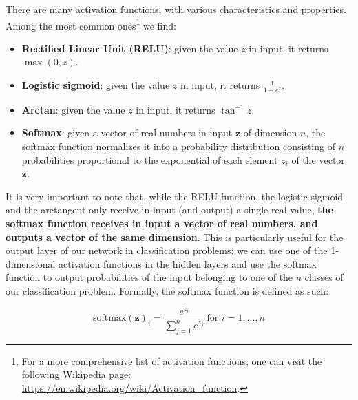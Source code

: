 There are many activation functions, with various characteristics and properties. Among the most common ones\footnote{For a more comprehensive list of activation functions, one can visit the following Wikipedia page: \url{https://en.wikipedia.org/wiki/Activation_function}.} we find:

\begin{itemize}
    \item \textbf{Rectified Linear Unit (RELU)}: given the value $z$ in input, it returns $\max(0,z)$.
    \item \textbf{Logistic sigmoid}: given the value $z$ in input, it returns $\frac{1}{1+e^z}$.
    \item \textbf{Arctan}: given the value $z$ in input, it returns $\tan^{-1}z$.
    \item \textbf{Softmax}: given a vector of real numbers in input $\boldsymbol{z}$ of dimension $n$, the softmax function normalizes it into a probability distribution consisting of $n$ probabilities proportional to the exponential of each element $z_i$ of the vector $\boldsymbol{z}$.
\end{itemize}

It is very important to note that, while the RELU function, the logistic sigmoid and the arctangent only receive in input (and output) a single real value, \textbf{the softmax function receives in input a vector of real numbers, and outputs a vector of the same dimension}. This is particularly useful for the output layer of our network in classification problems: we can use one of the 1-dimensional activation functions in the hidden layers and use the softmax function to output probabilities of the input belonging to one of the $n$ classes of our classification problem. Formally, the softmax function is defined as such:

\begin{equation}
    \text{softmax}(\boldsymbol{z})_i= \frac{e^{z_i}}{\sum_{j=1}^{n} e^{z_j}} \  \text{for } i = 1, ..., n
\end{equation}